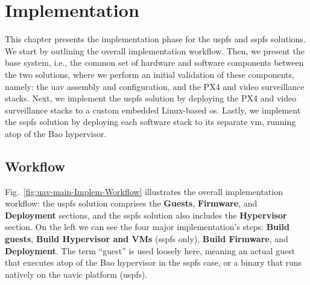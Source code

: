 %
\chapter{Implementation}
\label{cha:implementation}
This chapter presents the implementation phase for the \gls{uspfs} and
\gls{sspfs} solutions. We start by outlining the overall implementation
workflow. Then, we present the base system, i.e., the common set of hardware and
software components between the two solutions, where we perform an initial
validation of these components, namely: the \gls{uav} assembly and
configuration, and the PX4 and video surveillance stacks. Next, we implement the
\gls{uspfs} solution by deploying the
PX4 and video surveillance stacks to a custom embedded Linux-based
\gls{os}. Lastly, we implement the \gls{sspfs} solution by deploying each
software stack to its separate \gls{vm}, running atop of the Bao hypervisor.

\section{Workflow}
\label{sec:workflow}
Fig.~\ref{fig:uav-main-Implem-Workflow} illustrates the overall implementation
workflow: the \gls{uspfs} solution comprises the \textbf{Guests}, \textbf{Firmware},
and \textbf{Deployment} sections, and the \gls{sspfs} solution also includes the
\textbf{Hypervisor} section. On the left we can see the four major
implementation's steps: \textbf{Build guests},
\textbf{Build Hypervisor and VMs} (\gls{sspfs} only), \textbf{Build Firmware},
and \textbf{Deployment}. The term ``guest'' is used loosely here, meaning an
actual guest that executes atop of the Bao hypervisor in the \gls{sspfs} case,
or a binary that runs natively on the \gls{uavic} platform (\gls{uspfs}).

